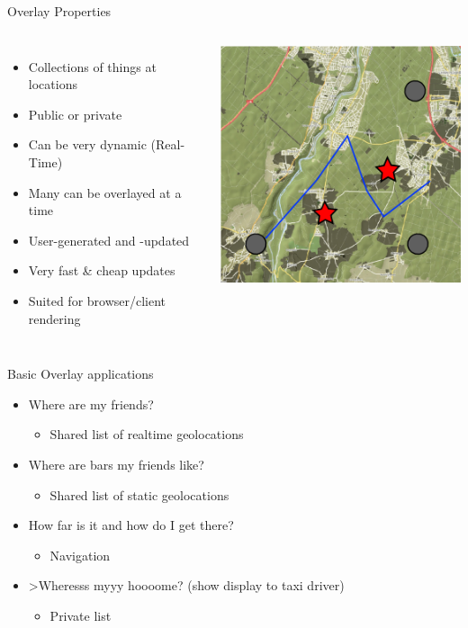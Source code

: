 \documentclass{beamer}
\begin{document}
\begin{frame}{Overlay Properties}
 \begin{columns}
   \begin{itemize}
    \item Collections of things at locations
    \item Public or private
    \item Can be very dynamic (Real-Time)
    \item Many can be overlayed at a time
    \item User-generated and -updated
    \item Very fast \& cheap updates
    \item Suited for browser/client rendering
   \end{itemize}
   \includegraphics[scale=0.5]{images/overlay_view}
 \end{columns}
\end{frame}

\begin{frame}{Basic Overlay applications}{}
   \begin{itemize}
    \item Where are my friends?
    \begin{itemize}
    \item Shared list of realtime geolocations
   \end{itemize}
    \item Where are bars my friends like?
    \begin{itemize}
    \item Shared list of static geolocations
   \end{itemize}
    \item How far is it and how do I get there?
    \begin{itemize}
    \item Navigation
   \end{itemize}
    \item >Wheresss myyy hoooome? (show display to taxi driver)
    \begin{itemize}
    \item Private list
   \end{itemize}
   \end{itemize}
\end{frame}
\end{document}
